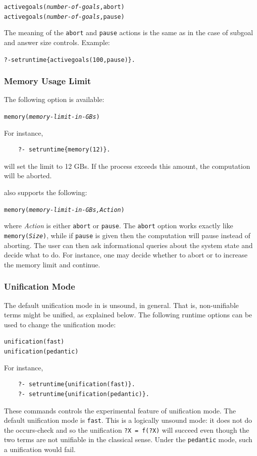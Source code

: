 \documentclass[11pt]{article}
\newcommand{\ERGO}{\mbox{\smaller{\ensuremath{\cal{E}}\smaller{{\sc{RGO}}}}}\xspace}
\newcommand{\FLSYSTEM}{\ERGO}
\begin{document}
\begin{alltt}
    activegoals(\emph{number-of-goals},abort)
    activegoals(\emph{number-of-goals},pause)
\end{alltt}
The meaning of the \texttt{abort}   and \texttt{pause}  actions
is the same as in the case of subgoal and answer size controls.
Example:
\begin{alltt}
    ?- setruntime\{activegoals(100,pause)\}.
\end{alltt}

\subsubsection{Memory Usage Limit}

The following option is available:
\begin{alltt}
    memory(\textit{memory-limit-in-GBs})
\end{alltt}
For instance,
\begin{verbatim}
    ?- setruntime{memory(12)}.
\end{verbatim}
will set the limit to 12 GBs. If the \FLSYSTEM process exceeds this amount,
the computation will be aborted.

\noindent
\ERGO also supports the following:
\begin{alltt}
    memory(\textit{memory-limit-in-GBs,Action})
\end{alltt}
where \emph{Action} is either \texttt{abort} or \texttt{pause}. The
\texttt{abort} option works exactly like
\texttt{memory(\textit{Size})}, while if \texttt{pause} is given then
the computation will pause instead of aborting. The user can then ask
informational queries about the system state and decide what to do.
For instance, one may decide whether to abort or to increase the memory
limit and continue.

\subsubsection{Unification Mode}

The default unification mode in \FLSYSTEM is
unsound, in general. That is, non-unifiable terms might be unified, as
explained below. The following runtime options can be used to change the
unification mode:
\begin{alltt}
    unification(fast)
    unification(pedantic)
\end{alltt}
For instance,
\begin{verbatim}
    ?- setruntime{unification(fast)}.
    ?- setruntime{unification(pedantic)}.
\end{verbatim}
These commands controls the experimental feature of unification mode.
The default unification mode is \texttt{fast}. This is a logically unsound
mode: it does not do the occurs-check and so the unification
\texttt{?X = f(?X)} will succeed even though the two terms are not
unifiable in the classical sense. Under the \texttt{pedantic} mode, such a
unification would fail.
\end{document}
